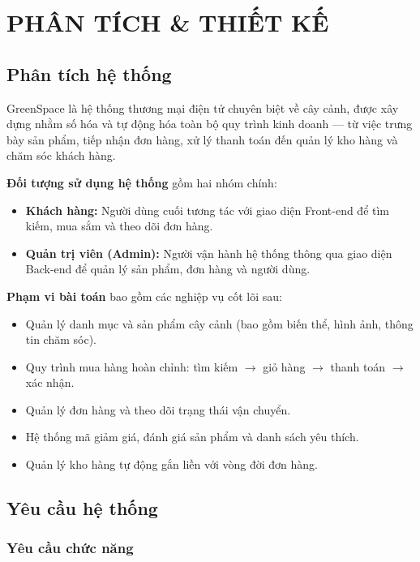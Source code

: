 \documentclass[11pt, a4paper]{article}
\let\oldsection\section
\renewcommand{\section}{\FloatBarrier\oldsection}
\begin{document}
\section{PHÂN TÍCH \& THIẾT KẾ}

\subsection{Phân tích hệ thống}

GreenSpace là hệ thống thương mại điện tử chuyên biệt về cây cảnh, được xây dựng nhằm số hóa và tự động hóa toàn bộ quy trình kinh doanh --- từ việc trưng bày sản phẩm, tiếp nhận đơn hàng, xử lý thanh toán đến quản lý kho hàng và chăm sóc khách hàng.

\textbf{Đối tượng sử dụng hệ thống} gồm hai nhóm chính:
\begin{itemize}[leftmargin=*]
    \item \textbf{Khách hàng:} Người dùng cuối tương tác với giao diện Front-end để tìm kiếm, mua sắm và theo dõi đơn hàng.
    \item \textbf{Quản trị viên (Admin):} Người vận hành hệ thống thông qua giao diện Back-end để quản lý sản phẩm, đơn hàng và người dùng.
\end{itemize}

\textbf{Phạm vi bài toán} bao gồm các nghiệp vụ cốt lõi sau:
\begin{itemize}[leftmargin=*]
    \item Quản lý danh mục và sản phẩm cây cảnh (bao gồm biến thể, hình ảnh, thông tin chăm sóc).
    \item Quy trình mua hàng hoàn chỉnh: tìm kiếm $\rightarrow$ giỏ hàng $\rightarrow$ thanh toán $\rightarrow$ xác nhận.
    \item Quản lý đơn hàng và theo dõi trạng thái vận chuyển.
    \item Hệ thống mã giảm giá, đánh giá sản phẩm và danh sách yêu thích.
    \item Quản lý kho hàng tự động gắn liền với vòng đời đơn hàng.
\end{itemize}

\subsection{Yêu cầu hệ thống}

\subsubsection{Yêu cầu chức năng}
\end{document}
